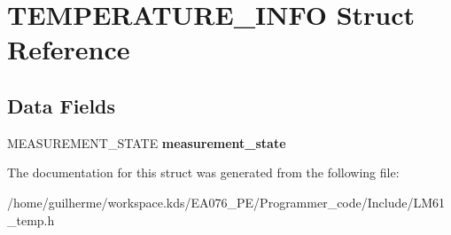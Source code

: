 \hypertarget{struct_t_e_m_p_e_r_a_t_u_r_e___i_n_f_o}{}\section{T\+E\+M\+P\+E\+R\+A\+T\+U\+R\+E\+\_\+\+I\+N\+FO Struct Reference}
\label{struct_t_e_m_p_e_r_a_t_u_r_e___i_n_f_o}
\subsection*{Data Fields}
\begin{DoxyCompactItemize}
\item 
\mbox{\label{struct_t_e_m_p_e_r_a_t_u_r_e___i_n_f_o_a5e870fc4368af5c0351d696dc1332108}} 
M\+E\+A\+S\+U\+R\+E\+M\+E\+N\+T\+\_\+\+S\+T\+A\+TE {\bfseries measurement\+\_\+state}
\end{DoxyCompactItemize}


The documentation for this struct was generated from the following file\+:\begin{DoxyCompactItemize}
\item 
/home/guilherme/workspace.\+kds/\+E\+A076\+\_\+\+P\+E/\+Programmer\+\_\+code/\+Include/L\+M61\+\_\+temp.\+h\end{DoxyCompactItemize}
